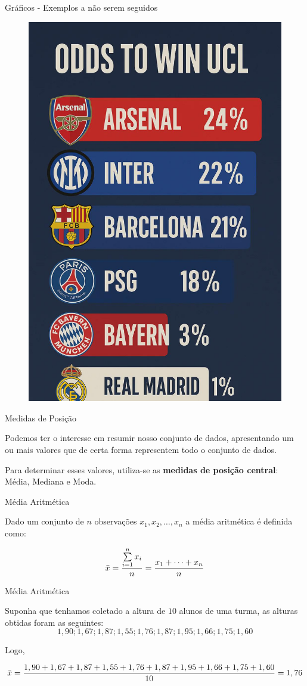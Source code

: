 \begin{frame}{Gráficos - Exemplos a não serem seguidos}
    \begin{figure}
        \centering
        \includegraphics[width=0.4\linewidth]{figures/lie_7.jpeg}
    \end{figure}
\end{frame}

\begin{frame}{Medidas de Posição}

Podemos ter o interesse em resumir nosso conjunto de dados, apresentando um ou mais valores que de certa forma representem todo o conjunto de dados.

Para determinar esses valores, utiliza-se as \textbf{medidas de posição central}: Média, Mediana e Moda. 

\end{frame}

\begin{frame}{Média Aritmética}

Dado um conjunto de $n$ observações $x_1, x_2, \dots, x_n$ a média aritmética é definida como:

$$\Bar{x} = \dfrac{\sum\limits_{i=1}^n x_i}{n} = \dfrac{x_1 + \dots + x_n}{n}$$

\end{frame}

\begin{frame}{Média Aritmética}
\begin{exemplo}
    Suponha que tenhamos coletado a altura de $10$ alunos de uma turma, as alturas obtidas foram as seguintes:
    $$1,90; 1,67; 1,87; 1,55; 1,76; 1,87; 1,95; 1,66; 1,75; 1,60$$
\end{exemplo}

Logo, 

{\footnotesize $$\Bar{x} = \dfrac{1,90 + 1,67 + 1,87 + 1,55 + 1,76 + 1,87 + 1,95 + 1,66 + 1,75 + 1,60}{10} = 1,76$$}
\end{frame}

